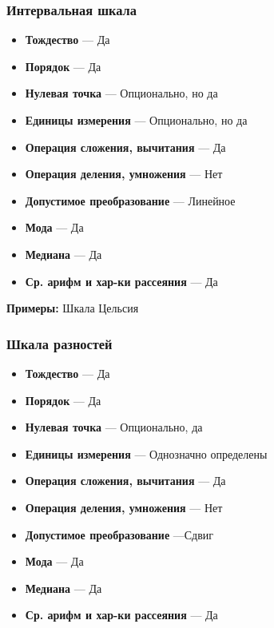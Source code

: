 \documentclass{article}
\begin{document}
    \subsubsection{Интервальная шкала}

    \begin{itemize}
        \item \textbf{Тождество} --- Да
        \item \textbf{Порядок} --- Да
        \item \textbf{Нулевая точка} --- Опционально, но да
        \item \textbf{Единицы измерения} --- Опционально, но да
        \item \textbf{Операция сложения, вычитания} --- Да
        \item \textbf{Операция деления, умножения} --- Нет
        \item \textbf{Допустимое преобразование} --- Линейное
        \item \textbf{Мода} --- Да
        \item \textbf{Медиана} --- Да
        \item \textbf{Ср. арифм и хар-ки рассеяния} --- Да
    \end{itemize}

    \textbf{Примеры:} Шкала Цельсия



    \subsubsection{Шкала разностей}

    \begin{itemize}
        \item \textbf{Тождество} --- Да
        \item \textbf{Порядок} --- Да
        \item \textbf{Нулевая точка} --- Опционально, да
        \item \textbf{Единицы измерения} --- Однозначно определены
        \item \textbf{Операция сложения, вычитания} --- Да
        \item \textbf{Операция деления, умножения} --- Нет
        \item \textbf{Допустимое преобразование} ---Сдвиг
        \item \textbf{Мода} --- Да
        \item \textbf{Медиана} --- Да
        \item \textbf{Ср. арифм и хар-ки рассеяния} --- Да
    \end{itemize}
\end{document}
